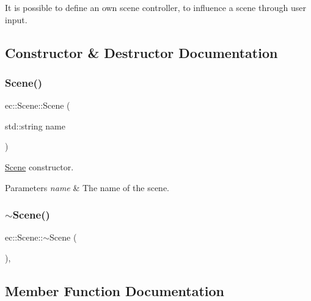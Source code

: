 It is possible to define an own scene controller, to influence a scene through user input. 

\subsection{Constructor \& Destructor Documentation}
\mbox{\label{classec_1_1_scene_a9abac0a0de42ff4e9eb6481cf1927754}} 
\subsubsection{\texorpdfstring{Scene()}{Scene()}}
{\footnotesize\ttfamily ec\+::\+Scene\+::\+Scene (\begin{DoxyParamCaption}\item[{std\+::string}]{name }\end{DoxyParamCaption})\hspace{0.3cm}{\ttfamily [explicit]}}



\mbox{\hyperlink{classec_1_1_scene}{Scene}} constructor. 


\begin{DoxyParams}{Parameters}
{\em name} & The name of the scene. \\
\hline
\end{DoxyParams}
\mbox{\label{classec_1_1_scene_a25e849d1bd5a9a71af922c3668115cb6}} 
\subsubsection{\texorpdfstring{$\sim$\+Scene()}{~Scene()}}
{\footnotesize\ttfamily ec\+::\+Scene\+::$\sim$\+Scene (\begin{DoxyParamCaption}{ }\end{DoxyParamCaption})\hspace{0.3cm}{\ttfamily [virtual]}, {\ttfamily [default]}}



\subsection{Member Function Documentation}
\mbox{\label{classec_1_1_scene_a05bf59f23abb809000ad17bdb00cab94}} 
